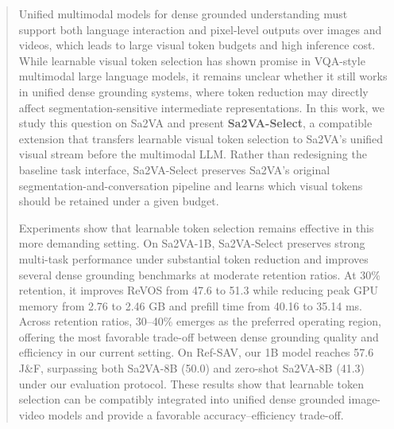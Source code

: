 \begin{abstract}
Unified multimodal models for dense grounded understanding must support both language interaction and pixel-level outputs over images and videos, which leads to large visual token budgets and high inference cost.
While learnable visual token selection has shown promise in VQA-style multimodal large language models, it remains unclear whether it still works in unified dense grounding systems, where token reduction may directly affect segmentation-sensitive intermediate representations.
In this work, we study this question on Sa2VA and present \textbf{Sa2VA-Select}, a compatible extension that transfers learnable visual token selection to Sa2VA's unified visual stream before the multimodal LLM.
Rather than redesigning the baseline task interface, Sa2VA-Select preserves Sa2VA's original segmentation-and-conversation pipeline and learns which visual tokens should be retained under a given budget.

Experiments show that learnable token selection remains effective in this more demanding setting.
On Sa2VA-1B, Sa2VA-Select preserves strong multi-task performance under substantial token reduction and improves several dense grounding benchmarks at moderate retention ratios.
At 30\% retention, it improves ReVOS from 47.6 to 51.3 while reducing peak GPU memory from 2.76 to 2.46 GB and prefill time from 40.16 to 35.14 ms.
Across retention ratios, 30--40\% emerges as the preferred operating region, offering the most favorable trade-off between dense grounding quality and efficiency in our current setting.
On Ref-SAV, our 1B model reaches 57.6 J\&F, surpassing both Sa2VA-8B (50.0) and zero-shot Sa2VA-8B (41.3) under our evaluation protocol.
These results show that learnable token selection can be compatibly integrated into unified dense grounded image-video models and provide a favorable accuracy--efficiency trade-off.
\end{abstract}
